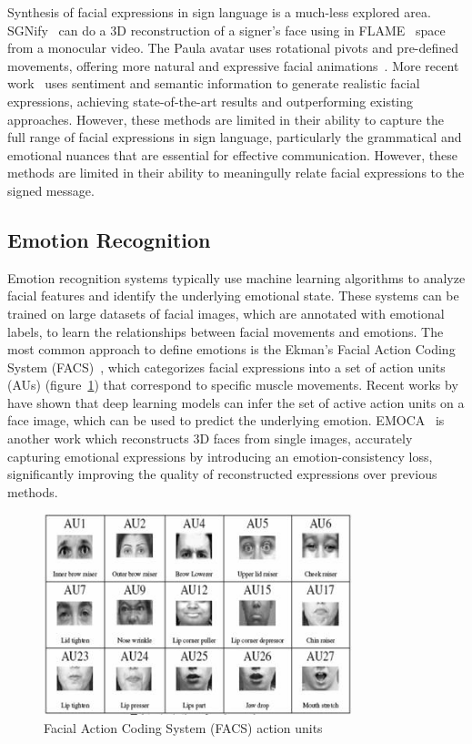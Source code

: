 \documentclass[../../main]{subfiles}
\begin{document}
Synthesis of facial expressions in sign language is a much-less explored area. SGNify~\cite{Forte_2023_CVPR} can do a 3D reconstruction of a signer's face using in FLAME~\cite{FLAME} space from a monocular video. The Paula avatar uses rotational pivots and pre-defined movements, offering more natural and expressive facial animations~\cite{johnson-2022-improved}. More recent work~\cite{azevedo2024empowering} uses sentiment and semantic information to generate realistic facial expressions, achieving state-of-the-art results and outperforming existing approaches. However, these methods are limited in their ability to capture the full range of facial expressions in sign language, particularly the grammatical and emotional nuances that are essential for effective communication. However, these methods are limited in their ability to meaningully relate facial expressions to the signed message.

\subsection{Emotion Recognition}
\label{ch:facial_expressions:related_work:emotion_recognition}

Emotion recognition systems typically use machine learning algorithms to analyze facial features and identify the underlying emotional state. These systems can be trained on large datasets of facial images, which are annotated with emotional labels, to learn the relationships between facial movements and emotions. The most common approach to define emotions is the Ekman's Facial Action Coding System (FACS)~\cite{ekman1978facial}, which categorizes facial expressions into a set of action units (AUs) (figure~\ref{ch:facial_expressions:fig:action_units})  that correspond to specific muscle movements. Recent works by~\cite{luo2022learning} have shown that deep learning models can infer the set of active action units on a face image, which can be used to predict the underlying emotion. EMOCA~\cite{danvevcek2022emoca} is another work which reconstructs 3D faces from single images, accurately capturing emotional expressions by introducing an emotion-consistency loss, significantly improving the quality of reconstructed expressions over previous methods.

\begin{figure}
    \centering
    \includegraphics[width=0.8\textwidth]{chapters/facial_expressions/images/action_units.jpg}
    \caption{Facial Action Coding System (FACS) action units}
    \label{ch:facial_expressions:fig:action_units}
\end{figure}
\end{document}
